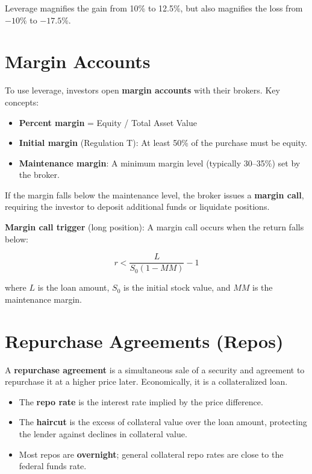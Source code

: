 \documentclass[11pt,letterpaper]{report}
\begin{document}
Leverage magnifies the gain from 10\% to 12.5\%, but also magnifies the loss from $-10\%$ to $-17.5\%$.

\section{Margin Accounts}


To use leverage, investors open \textbf{margin accounts} with their brokers.  Key concepts:

\begin{itemize}
  \item \textbf{Percent margin} = Equity / Total Asset Value
  \item \textbf{Initial margin} (Regulation T): At least 50\% of the purchase must be equity.
  \item \textbf{Maintenance margin}: A minimum margin level (typically 30--35\%) set by the broker.
\end{itemize}

If the margin falls below the maintenance level, the broker issues a \textbf{margin call}, requiring the investor to deposit additional funds or liquidate positions.

\textbf{Margin call trigger} (long position): A margin call occurs when the return falls below:

$$r < \frac{L}{S_0(1 - MM)} - 1$$

where $L$ is the loan amount, $S_0$ is the initial stock value, and $MM$ is the maintenance margin.

\section{Repurchase Agreements (Repos)}


A \textbf{repurchase agreement} is a simultaneous sale of a security and agreement to repurchase it at a higher price later.  Economically, it is a collateralized loan.

\begin{itemize}
  \item The \textbf{repo rate} is the interest rate implied by the price difference.
  \item The \textbf{haircut} is the excess of collateral value over the loan amount, protecting the lender against declines in collateral value.
  \item Most repos are \textbf{overnight}; general collateral repo rates are close to the federal funds rate.
\end{itemize}
\end{document}
